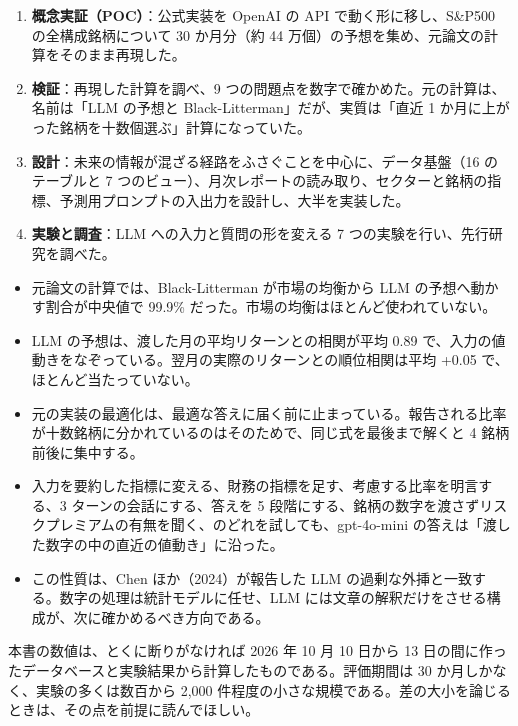 \documentclass[xelatex,ja=standard,jafont=hiragino-pron,a4paper,10pt]{bxjsreport}
\newcommand{\SP}{S\&P500}
\begin{document}
\begin{enumerate}
\item \textbf{概念実証（POC）}：公式実装を OpenAI の API で動く形に移し、\SP{} の全構成銘柄について 30 か月分（約 44 万個）の予想を集め、元論文の計算をそのまま再現した。
\item \textbf{検証}：再現した計算を調べ、9 つの問題点を数字で確かめた。元の計算は、名前は「LLM の予想と Black-Litterman」だが、実質は「直近 1 か月に上がった銘柄を十数個選ぶ」計算になっていた。
\item \textbf{設計}：未来の情報が混ざる経路をふさぐことを中心に、データ基盤（16 のテーブルと 7 つのビュー）、月次レポートの読み取り、セクターと銘柄の指標、予測用プロンプトの入出力を設計し、大半を実装した。
\item \textbf{実験と調査}：LLM への入力と質問の形を変える 7 つの実験を行い、先行研究を調べた。
\end{enumerate}

\begin{keybox}[本書の主な結論]
\begin{itemize}
\item 元論文の計算では、Black-Litterman が市場の均衡から LLM の予想へ動かす割合が中央値で 99.9\% だった。市場の均衡はほとんど使われていない。
\item LLM の予想は、渡した月の平均リターンとの相関が平均 0.89 で、入力の値動きをなぞっている。翌月の実際のリターンとの順位相関は平均 +0.05 で、ほとんど当たっていない。
\item 元の実装の最適化は、最適な答えに届く前に止まっている。報告される比率が十数銘柄に分かれているのはそのためで、同じ式を最後まで解くと 4 銘柄前後に集中する。
\item 入力を要約した指標に変える、財務の指標を足す、考慮する比率を明言する、3 ターンの会話にする、答えを 5 段階にする、銘柄の数字を渡さずリスクプレミアムの有無を聞く、のどれを試しても、gpt-4o-mini の答えは「渡した数字の中の直近の値動き」に沿った。
\item この性質は、Chen ほか（2024）が報告した LLM の過剰な外挿と一致する。数字の処理は統計モデルに任せ、LLM には文章の解釈だけをさせる構成が、次に確かめるべき方向である。
\end{itemize}
\end{keybox}

本書の数値は、とくに断りがなければ 2026 年 10 月 10 日から 13 日の間に作ったデータベースと実験結果から計算したものである。評価期間は 30 か月しかなく、実験の多くは数百から 2,000 件程度の小さな規模である。差の大小を論じるときは、その点を前提に読んでほしい。
\end{document}
